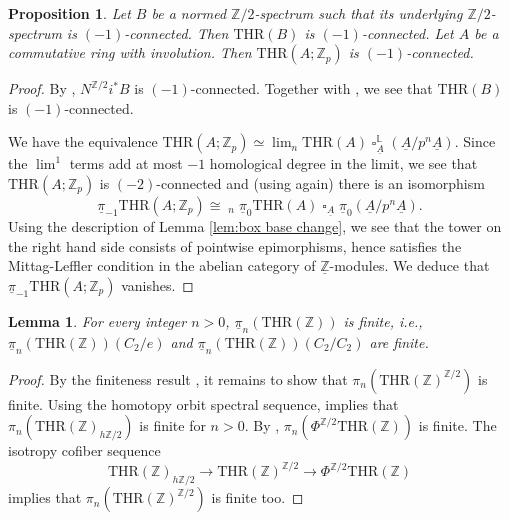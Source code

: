 \documentclass[10pt]{amsart}
\newtheorem{prop}[thm]{Proposition}
\newtheorem{lem}[thm]{Lemma}
\theoremstyle{definition}
\numberwithin{equation}{section}
\renewcommand{\L}{\mathbb{L}}
\newcommand{\Z}{\mathbb{Z}}
\newcommand{\ul}{\underline}
\DeclareMathOperator{\sotimes}{\square}
\newcommand{\THR}{\mathrm{THR}}
\begin{document}
\begin{prop}
\label{connective}
Let $B$ be a normed $\Z/2$-spectrum such that its underlying $\Z/2$-spectrum is $(-1)$-connected.
Then $\THR(B)$ is $(-1)$-connected.
Let $A$ be a commutative ring with involution.
Then $\THR(A;\Z_p)$ is $(-1)$-connected.
\end{prop}
\begin{proof}
By \cite[Proposition A.3.7]{HP23},
$N^{\Z/2} i^*B$ is $(-1)$-connected.
Together with \cite[Corollary 6.8.1]{BGS20},
we see that $\THR(B)$ is $(-1)$-connected.

We have the equivalence $\THR(A;\Z_p)\simeq \lim_n \THR(A)\sotimes_{\ul{A}}^\L (\ul{A}/p^n\ul{A})$.
Since the $\lim^1$ terms add at most $-1$ homological degree in the limit,
we see that $\THR(A;\Z_p)$ is $(-2)$-connected 
and (using \cite[Corollary 6.8.1]{BGS20} again) there is an isomorphism
\[
\ul{\pi}_{-1}\THR(A;\Z_p)
\cong
\mathop{\mathrm{lim}^1}_n \ul{\pi}_0\THR(A) \sotimes_{\ul{A}}\ul{\pi}_0 (\ul{A}/p^n \ul{A}).
\]
Using the description of Lemma \ref{lem:box base change}, we see that the tower on the right hand side consists of pointwise epimorphisms, hence satisfies the Mittag-Leffler condition in the abelian category of $\ul{\Z}$-modules.
We deduce that $\ul{\pi}_{-1}\THR(A;\Z_p)$ vanishes.
\end{proof}

\begin{lem}
\label{lem:finiteness of THR}
For every integer $n>0$,
$\ul{\pi}_n(\THR(\Z))$ is finite, i.e., $\ul{\pi}_n(\THR(\Z))(C_2/e)$ and $\ul{\pi}_n(\THR(\Z))(C_2/C_2)$ are finite.
\end{lem}
\begin{proof}
By the finiteness result \cite[Lemma 2.5]{BMS19},
it remains to show that $\pi_n(\THR(\Z)^{\Z/2})$ is finite.
Using the homotopy orbit spectral sequence, \cite[Lemma 2.5]{BMS19} implies that
$\pi_n(\THR(\Z)_{h \Z/2})$ is finite for $n>0$. 
By \cite[Theorem 5.20]{DMPR21},
$\pi_n(\Phi^{\Z/2} \THR(\Z))$ is finite.
The isotropy cofiber sequence
\[
\THR(\Z)_{h \Z/2}
\to
\THR(\Z)^{\Z/2}
\to
\Phi^{\Z/2} \THR(\Z)
\]
implies that $\pi_n(\THR(\Z)^{\Z/2})$ is finite too.
\end{proof}
\end{document}
